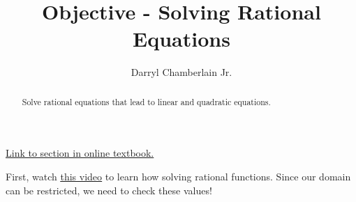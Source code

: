 \documentclass{ximera}
\author{Darryl Chamberlain Jr.}
\title{Objective - Solving Rational Equations}
\begin{document}
\begin{abstract}
Solve rational equations that lead to linear and quadratic equations.
\end{abstract}
\maketitle

\href{https://cnx.org/contents/mwjClAV_@8.1:KNTP2r7D@13/Rational-Functions}{Link to section in online textbook.}


First, watch 
\underline{\href{https://mediasite.video.ufl.edu/Mediasite/Play/ffc3b5525c1f48cf96b92988eca638641d}{this video}} to learn how solving rational functions. Since our domain can be restricted, we need to check these values!
\end{document}
